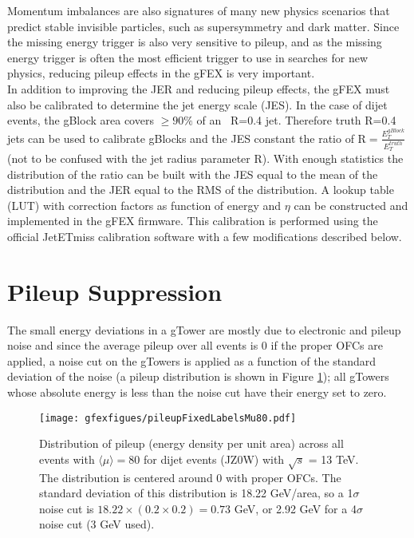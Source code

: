 Momentum imbalances are also signatures of many new physics scenarios that predict stable invisible particles, such as supersymmetry and dark matter.  Since the missing energy trigger is also very sensitive to pileup, and as the missing energy trigger is often the most efficient trigger to use in searches for new physics, reducing pileup effects in the gFEX is very important. \\

In addition to improving the JER and reducing pileup effects, the gFEX must also be calibrated to determine the jet energy scale (JES).  In the case of dijet events, the gBlock area covers $\geq 90\% $ of an \antikt\ R=0.4 jet.  Therefore truth R=0.4 jets can be used to calibrate gBlocks and the JES constant the ratio of R$=\frac{E_{T}^{gBlock}}{E_{T}^{truth}}$ (not to be confused with the jet radius parameter R).  With enough statistics the distribution of the ratio can be built with the JES equal to the mean of the distribution and the JER equal to the RMS of the distribution.  A lookup table (LUT) with correction factors as function of energy and $\eta$ can be constructed and implemented in the gFEX firmware.  This calibration is performed using the official JetETmiss calibration software with a few modifications described below.  \\

\section{Pileup Suppression}


The small energy deviations in a gTower are mostly due to electronic and pileup noise and since the average pileup over all events is 0 if the proper OFCs are applied, a noise cut on the gTowers is applied as a function of the standard deviation of the noise (a pileup distribution is shown in Figure \ref{fig:gfexpileup}); all gTowers whose absolute energy is less than the noise cut have their energy set to zero. \\%

\begin{figure}[h!]
  \centering
	\texttt{[image: gfexfigues/pileupFixedLabelsMu80.pdf]}%
\caption[Distribution of pileup across all events]{\label{fig:gfexpileup}{Distribution of pileup (energy density per unit area) across all events with $\langle \mu \rangle = 80$ for dijet events (JZ0W) with $\sqrt{s}$ = 13 TeV.  The distribution is centered around 0 with proper OFCs.  The standard deviation of this distribution is 18.22 GeV/area, so a 1$\sigma$ noise cut is $18.22 \times (0.2 \times 0.2)=0.73$ GeV, or 2.92 GeV for a 4$\sigma$ noise cut (3 GeV used). }} 
\end{figure}	

